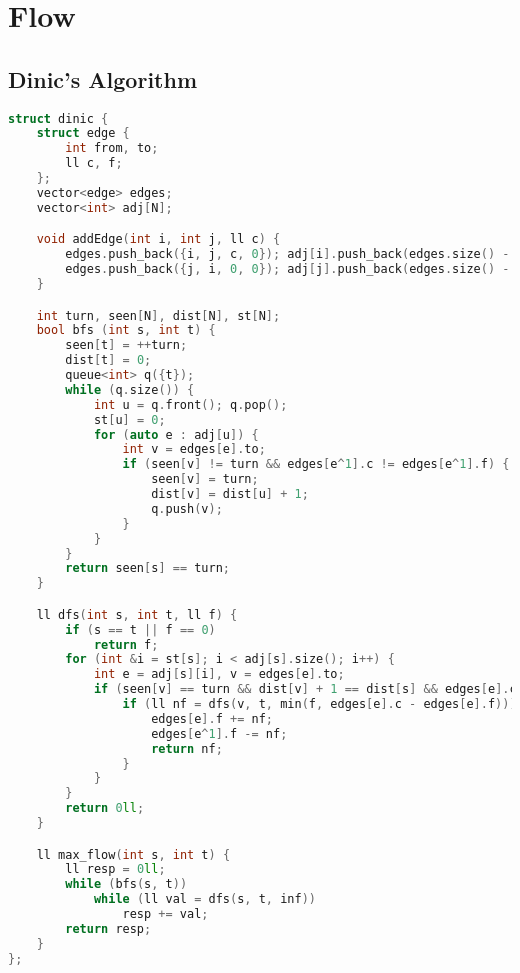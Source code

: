 \documentclass{article}
\begin{document}
\section{Flow}
\subsection{Dinic's Algorithm}
\begin{lstlisting}[language=C++]
struct dinic {
	struct edge {
		int from, to;
		ll c, f;
	};
	vector<edge> edges;
	vector<int> adj[N];

	void addEdge(int i, int j, ll c) {
		edges.push_back({i, j, c, 0}); adj[i].push_back(edges.size() - 1);
		edges.push_back({j, i, 0, 0}); adj[j].push_back(edges.size() - 1);
	}

	int turn, seen[N], dist[N], st[N];
	bool bfs (int s, int t) {
		seen[t] = ++turn;
		dist[t] = 0; 
		queue<int> q({t});
		while (q.size()) {
			int u = q.front(); q.pop();
			st[u] = 0;
			for (auto e : adj[u]) {
				int v = edges[e].to;
				if (seen[v] != turn && edges[e^1].c != edges[e^1].f) {
					seen[v] = turn;
					dist[v] = dist[u] + 1;
					q.push(v);
				}
			}
		}
		return seen[s] == turn;
	}

	ll dfs(int s, int t, ll f) {
		if (s == t || f == 0)
			return f;
		for (int &i = st[s]; i < adj[s].size(); i++) {
			int e = adj[s][i], v = edges[e].to;
			if (seen[v] == turn && dist[v] + 1 == dist[s] && edges[e].c > edges[e].f) {
				if (ll nf = dfs(v, t, min(f, edges[e].c - edges[e].f))) {
					edges[e].f += nf;
					edges[e^1].f -= nf;
					return nf;
				}
			}
		}
		return 0ll;
	}

	ll max_flow(int s, int t) {
		ll resp = 0ll;
		while (bfs(s, t))
			while (ll val = dfs(s, t, inf))
				resp += val;
		return resp;
	}
};
\end{lstlisting}
\end{document}
